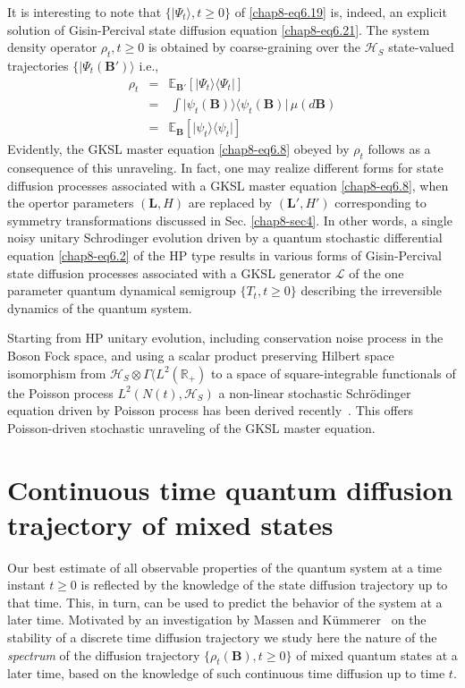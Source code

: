 It is interesting to note that $\{\vert\Psi_t\rangle, t\geq 0\}$ of \eqref{chap8-eq6.19} is, indeed, an explicit solution of Gisin-Percival state diffusion equation \eqref{chap8-eq6.21}. The system density operator $\rho_t, t\geq 0$ is obtained by coarse-graining over the $\mathcal{H}_S$ state-valued trajectories $\{\vert\Psi_t(\mathbf{B}')\rangle$ i.e.,   
\begin{eqnarray} 
		\rho_t&=&\mathbb{E}_{\mathbf{B}'}[\vert\Psi_t\rangle\langle\Psi_t\vert] \nonumber \\ 
		&=&\, \int \vert\psi_t(\mathbf{B})\rangle\langle\psi_t(\mathbf{B})\vert\,  
		\mu(d\mathbf{B}) \nonumber \\ 
		&=& \mathbb{E}_{\mathbf{B}}[\vert\psi_t\rangle\langle\psi_t\vert] \label{chap8-eq6.24}
\end{eqnarray}
Evidently, the GKSL master equation \eqref{chap8-eq6.8} obeyed by  $\rho_t$ follows as a consequence of this unraveling. In fact, one may realize different forms for state diffusion processes associated with a GKSL master equation \eqref{chap8-eq6.8}, when the opertor parameters $(\mathbf{L}, H)$ are replaced by $(\mathbf{L}', H')$ corresponding to symmetry transformations discussed in Sec. \ref{chap8-sec4}. In other words, a single noisy unitary Schrodinger evolution driven by a quantum stochastic differential equation \eqref{chap8-eq6.2} of the HP type results in various forms of Gisin-Percival state diffusion processes associated with a GKSL generator $\mathcal{L}$ of the one parameter quantum dynamical semigroup  $\{T_t, t\geq 0\}$ describing the irreversible dynamics of the  quantum system.  

Starting from  HP unitary evolution, including  conservation noise process in the Boson Fock space, and using a scalar product preserving Hilbert space isomorphism from  $\mathcal{H}_S\otimes\Gamma(L^2(\mathbb{R}_+)$ to a space  of square-integrable functionals of the Poisson process $L^2(N(t),\mathcal{H}_S)$ a non-linear stochastic Schr{\"o}dinger equation driven by Poisson process has been derived recently~\cite{chap8-key45}. This offers Poisson-driven stochastic unraveling of the GKSL master equation.         

\section{Continuous time quantum diffusion trajectory of  mixed states}\label{chap8-sec7}

Our best estimate of all observable properties of the quantum system at a time instant $t\geq 0$ is reflected by the knowledge of the state diffusion trajectory up to that time. This, in turn, can be used  to predict the behavior of the system at a later time. Motivated by an investigation by Massen and K{\"u}mmerer~\cite{chap8-key36} on the stability of a discrete time diffusion trajectory  we study here the nature of the {\em spectrum} of the diffusion trajectory $\{\rho_t(\mathbf{B}),t \geq 0\}$ of mixed quantum states at a later time, based on the knowledge of such continuous time diffusion up to time $t$.

